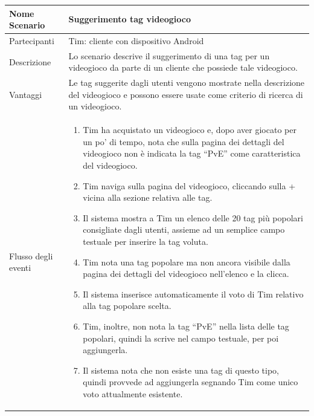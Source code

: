 	\small\begin{tabular}{|| l | p{30em} ||} 
	\hline
	Nome Scenario & Suggerimento tag videogioco\\
	\hline
	Partecipanti & Tim: cliente con dispositivo Android\\
	\hline
	Descrizione & Lo scenario descrive il suggerimento di una tag per un videogioco da parte di un cliente che possiede tale videogioco.\\
	\hline
	Vantaggi & Le tag suggerite dagli utenti vengono mostrate nella descrizione del videogioco e possono essere usate come criterio di ricerca di un videogioco.\\
	\hline
	Flusso degli eventi &
	\begin{enumerate}
		\item Tim ha acquistato un videogioco e, dopo aver giocato per un po’ di tempo, nota che sulla pagina dei dettagli del videogioco non è indicata la tag “PvE” come caratteristica del videogioco.
		\item Tim naviga sulla pagina del videogioco, cliccando sulla + vicina alla sezione relativa alle tag.
		\item Il sistema mostra a Tim un elenco delle 20 tag più popolari consigliate dagli utenti, assieme ad un semplice campo testuale per inserire la tag voluta.
		\item Tim nota una tag popolare ma non ancora visibile dalla pagina dei dettagli del videogioco nell’elenco e la clicca.
		\item Il sistema inserisce automaticamente il voto di Tim relativo alla tag popolare scelta.
		\item Tim, inoltre, non nota la tag “PvE” nella lista delle tag popolari, quindi la scrive nel campo testuale, per poi aggiungerla.
		\item Il sistema nota che non esiste una tag di questo tipo, quindi provvede ad aggiungerla segnando Tim come unico voto attualmente esistente.
	\end{enumerate} \\
	\hline
	\end{tabular}

